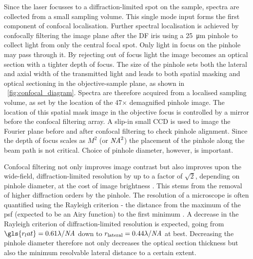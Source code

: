 \documentclass{article}
\begin{document}
Since the laser focusses to a diffraction-limited spot on the sample, spectra are collected from a small sampling volume. This single mode input forms the first component of confocal localisation. Further spectral localisation is achieved by confocally filtering the image plane after the DF iris using a \SI{25}{\micro\metre} pinhole to collect light from only the central focal spot. Only light in focus on the pinhole may pass through it. By rejecting out of focus light the image becomes an optical section with a tighter depth of focus. The size of the pinhole sets both the lateral and axial width of the transmitted light and leads to both spatial masking and optical sectioning in the objective-sample plane, as shown in \figurename~\ref{fig:confocal_diagram}. Spectra are therefore acquired from a localised sampling volume, as set by the location of the 47$\times$ demagnified pinhole image. The location of this spatial mask image in the objective focus is controlled by a mirror before the confocal filtering array. A slip-in small CCD is used to image the Fourier plane before and after confocal filtering to check pinhole alignment. Since the depth of focus scales as $M^2$ (or $\mathit{NA}^2$) the placement of the pinhole along the beam path is not critical. Choice of pinhole diameter, however, is important.

Confocal filtering not only improves image contrast but also improves upon the wide-field, diffraction-limited resolution by up to a factor of $\sqrt{2}$, depending on pinhole diameter, at the cost of image brightness \cite{webb1996confocal, murphy2002fundamentals, cox2004practical, hollricher2011high}. This stems from the removal of higher diffraction orders by the pinhole. The resolution of a microscope is often quantified using the Rayleigh criterion - the distance from the maximum of the \gls{psf} (expected to be an Airy function) to the first minimum  \cite{born1999principles}. A decrease in the Rayleigh criterion of diffraction-limited resolution is expected, going from $\gls{r_lat}=0.61\lambda/\NA$ down to $r_{\mathrm{lateral}}=0.44\lambda/\mathit{NA}$ at best.
Decreasing the pinhole diameter therefore not only decreases the optical section thickness but also the minimum resolvable lateral distance to a certain extent.
\end{document}
